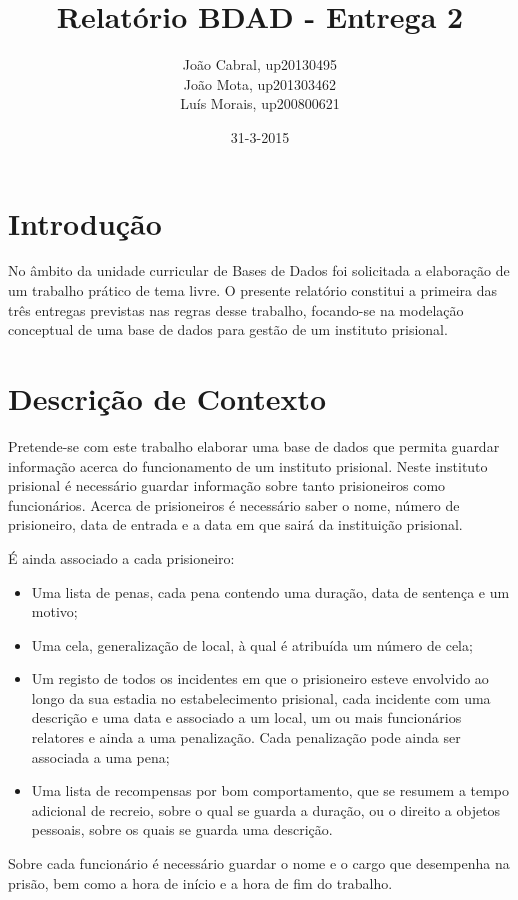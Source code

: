 \documentclass{article}
\title{Relatório BDAD - Entrega 2}
\date{31-3-2015}
\author{João Cabral, up20130495\\
	   João Mota, up201303462\\
	   Luís Morais, up200800621\\}
\begin{document}
\maketitle
{}
\newpage
{}
\renewcommand*\contentsname{Sumário}
\tableofcontents
\newpage
\section{Introdução}
No âmbito da unidade curricular de Bases de Dados foi solicitada a elaboração de um
trabalho prático de tema livre. O presente relatório constitui a primeira das três entregas
previstas nas regras desse trabalho, focando-se na modelação conceptual de uma base de
dados para gestão de um instituto prisional.


\section{Descrição de Contexto}
Pretende-se com este trabalho elaborar uma base de dados que permita guardar
informação acerca do funcionamento de um instituto prisional. Neste instituto prisional é
necessário guardar informação sobre tanto prisioneiros como funcionários.
Acerca de prisioneiros é necessário saber o nome, número de prisioneiro, data de entrada
e a data em que sairá da instituição prisional.

É ainda associado a cada prisioneiro:
\begin{itemize}
\item Uma lista de penas, cada pena contendo uma duração, data de sentença e um motivo;
\item Uma cela, generalização de local, à qual é atribuída um número de cela;
\item Um registo de todos os incidentes em que o prisioneiro esteve envolvido ao longo da sua estadia no estabelecimento prisional, cada incidente com uma descrição e uma data e associado a um local, um ou mais funcionários relatores e ainda a uma penalização. Cada penalização pode ainda ser associada a uma pena;
\item Uma lista de recompensas por bom comportamento, que se resumem a tempo adicional de recreio, sobre o qual se guarda a duração, ou o direito a objetos pessoais, sobre os quais se guarda uma descrição.
\end{itemize}
Sobre cada funcionário é necessário guardar o nome e o cargo que desempenha na prisão, bem como a hora de início e a hora de fim do trabalho.
\newpage
\end{document}
